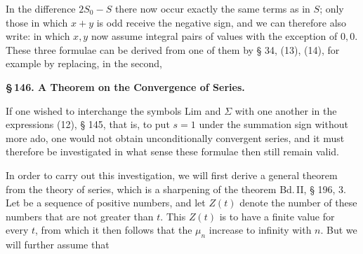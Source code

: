 In the difference $2S_0 - S$ there now occur exactly the same
terms as in $S$; only those in which $x+y$ is odd
receive the negative sign, and we can therefore also write:
in which $x, y$ now assume  integral pairs of values with the exception
of $0,0$. These three formulae can be derived from one of them by § 34, (13), (14),
for example by replacing, in the second,
\begin{center}\textbf{\S\,146. A Theorem on the Convergence of Series.}\end{center}

If one wished to interchange the symbols Lim and $\Sigma$ with one another
in the expressions (12), § 145, that is, to put $s=1$ under the
summation sign without more ado, one would not obtain unconditionally
convergent series, and it must therefore be investigated
in what sense these formulae then still remain valid.

In order to carry out this investigation, we will first
derive a general theorem from the theory of series, which is a
sharpening of the theorem Bd.\,II, § 196, 3. Let
be a sequence of  positive numbers, and let $Z(t)$
denote the number of these numbers that are not greater than $t$.
This $Z(t)$ is to have a finite value for every $t$, from which
it then follows that the $\mu_n$ increase to infinity with $n$. But we
will further assume that
